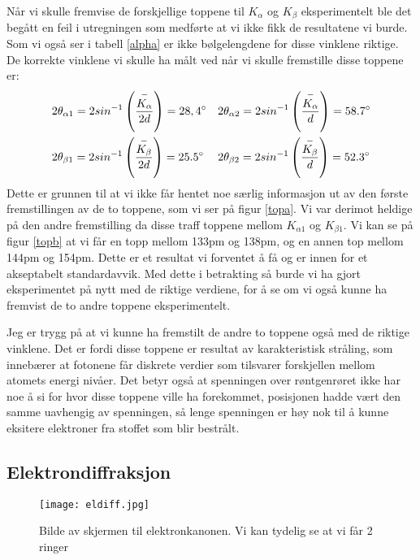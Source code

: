 \documentclass[norsk,a4paper,12pt]{article}
\begin{document}
Når vi skulle fremvise de forskjellige toppene til $K_\alpha$ og $K_\beta$ eksperimentelt ble det begått en feil i utregningen som medførte at vi ikke fikk de resultatene vi burde. Som vi også ser i tabell \vref{alpha} er ikke bølgelengdene for disse vinklene riktige. De korrekte vinklene vi skulle ha målt ved når vi skulle fremstille disse toppene er:
\begin{align*}
&2\theta_{\alpha1} = 2sin^{-1}\left(\frac{\overset{-}{K_\alpha}}{2d}\right) = 28,4\degree &&2\theta_{\alpha2} = 2sin^{-1}\left(\frac{\overset{-}{K_\alpha}}{d}\right) = 58.7\degree\\
&2\theta_{\beta1} = 2sin^{-1}\left(\frac{\overset{-}{K_\beta}}{2d}\right) = 25.5\degree
&&2\theta_{\beta2} = 2sin^{-1}\left(\frac{\overset{-}{K_\beta}}{d}\right) = 52.3\degree\\
\end{align*}
Dette er grunnen til at vi ikke får hentet noe særlig informasjon ut av den første fremstillingen av de to toppene, som vi ser på figur \vref{topa}. Vi var derimot heldige på den andre fremstilling da disse traff toppene mellom $K_{\alpha1}$ og $K_{\beta1}$. Vi kan se på figur \vref{topb} at vi får en topp mellom 133pm og 138pm, og en annen top mellom 144pm og 154pm. Dette er et resultat vi forventet å få og er innen for et akseptabelt standardavvik.
Med dette i betrakting så burde vi ha gjort eksperimentet på nytt med de riktige verdiene, for å se om vi også kunne ha fremvist de to andre toppene eksperimentelt. 

Jeg er trygg på at vi kunne ha fremstilt de andre to toppene også med de riktige vinklene. Det er fordi disse toppene er resultat av karakteristisk stråling, som innebærer at fotonene får diskrete verdier som tilsvarer forskjellen mellom atomets energi nivåer. Det betyr også at spenningen over røntgenrøret ikke har noe å si for hvor disse toppene ville ha forekommet, posisjonen hadde vært den samme uavhengig av spenningen, så lenge spenningen er høy nok til å kunne eksitere elektroner fra stoffet som blir bestrålt.

\subsection{Elektrondiffraksjon}

 \begin{figure}[h!]
	\begin{center}
  	\texttt{[image: eldiff.jpg]}\\
	\caption[Elektrondiffraksjon]{ Bilde av skjermen til elektronkanonen. Vi kan tydelig se at vi får 2 ringer}
	\label{eldiff}
	\end{center}
\end{figure}
\end{document}
